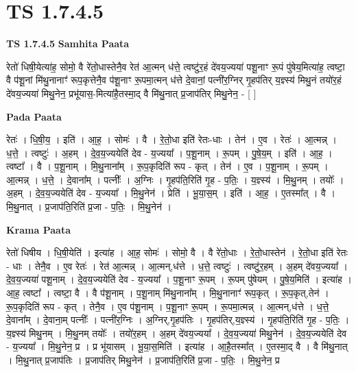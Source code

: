 \documentclass[17pt]{extarticle}
\begin{document}
\section*{ TS 1.7.4.5 }

\textbf{TS 1.7.4.5 } \newline
\textbf{Samhita Paata} \newline

रेतो॑ धिषी॒येत्या॑ह॒ सोमो॒ वै रे॑तो॒धास्तेनै॒व रेत॑ आ॒त्मन् ध॑त्ते॒ त्वष्टु॑र॒हं दे॑वय॒ज्यया॑ पशू॒नाꣳ रू॒पं पु॑षेय॒मित्या॑ह॒ त्वष्टा॒ वै प॑शू॒नां मि॑थु॒नानाꣳ॑ रूप॒कृत्तेनै॒व प॑शू॒नाꣳ रू॒पमा॒त्मन् ध॑त्ते दे॒वानां॒ पत्नी॑र॒ग्निर् गृ॒हप॑तिर् य॒ज्ञ्स्य॑ मिथु॒नं तयो॑र॒हं दे॑वय॒ज्यया॑ मिथु॒नेन॒ प्रभू॑यास॒-मित्या॑है॒तस्मा॒द् वै मि॑थु॒नात् प्र॒जाप॑तिर् मिथु॒नेन॒ - [ ] \newline

\textbf{Pada Paata} \newline

रेतः॑ । धि॒षी॒य॒ । इति॑ । आ॒ह॒ । सोमः॑ । वै । रे॒तो॒धा इति॑ रेतः-धाः । तेन॑ । ए॒व । रेतः॑ । आ॒त्मन्न् । ध॒त्ते॒ । त्वष्टुः॑ । अ॒हम् । दे॒व॒य॒ज्ययेति॑ देव - य॒ज्यया᳚ । प॒शू॒नाम् । रू॒पम् । पु॒षे॒य॒म् । इति॑ । आ॒ह॒ । त्वष्टा᳚ । वै । प॒शू॒नाम् । मि॒थु॒नाना᳚म् । रू॒प॒कृदिति॑ रूप - कृत् । तेन॑ । ए॒व । प॒शू॒नाम् । रू॒पम् । आ॒त्मन्न् । ध॒त्ते॒ । दे॒वाना᳚म् । पत्नीः᳚ । अ॒ग्निः । गृ॒हप॑ति॒रिति॑ गृ॒ह - प॒तिः॒ । य॒ज्ञ्स्य॑ । मि॒थु॒नम् । तयोः᳚ । अ॒हम् । दे॒व॒य॒ज्ययेति॑ देव - य॒ज्यया᳚ । मि॒थु॒नेन॑ । प्रेति॑ । भू॒या॒स॒म् । इति॑ । आ॒ह॒ । ए॒तस्मा᳚त् । वै । मि॒थु॒नात् । प्र॒जाप॑ति॒रिति॑ प्र॒जा - प॒तिः॒ । मि॒थु॒नेन॑ ।  \newline


\textbf{Krama Paata} \newline

रेतो॑ धिषीय । धि॒षी॒येति॑ । इत्या॑ह । आ॒ह॒ सोमः॑ । सोमो॒ वै । वै रे॑तो॒धाः । रे॒तो॒धास्तेन॑ । रे॒तो॒धा इति॑ रेतः - धाः । तेनै॒व । ए॒व रेतः॑ । रेत॑ आ॒त्मन्न् । आ॒त्मन्,ध॑त्ते । ध॒त्ते॒ त्वष्टुः॑ । त्वष्टु॑र॒हम् । अ॒हम् दे॑वय॒ज्यया᳚ । दे॒व॒य॒ज्यया॑ पशू॒नाम् । दे॒व॒य॒ज्ययेति॑ देव - य॒ज्यया᳚ । प॒शू॒नाꣳ रू॒पम् । रू॒पम् पु॑षेयम् । पु॒षे॒य॒मिति॑ । इत्या॑ह । आ॒ह॒ त्वष्टा᳚ । त्वष्टा॒ वै । वै प॑शू॒नाम् । प॒शू॒नाम् मि॑थु॒नाना᳚म् । मि॒थु॒नानाꣳ॑ रूप॒कृत् । रू॒प॒कृत्,तेन॑ । रू॒प॒कृदिति॑ रूप - कृत् । तेनै॒व । ए॒व प॑शू॒नाम् । प॒शू॒नाꣳ रू॒पम् । रू॒पमा॒त्मन्न् । आ॒त्मन्,ध॑त्ते । ध॒त्ते॒ दे॒वाना᳚म् । दे॒वाना॒म् पत्नीः᳚ । पत्नी॑र॒ग्निः । अ॒ग्निर्,गृ॒हप॑तिः । गृ॒हप॑तिर्,य॒ज्ञ्स्य॑ । गृ॒हप॑ति॒रिति॑ गृ॒ह - प॒तिः॒ । य॒ज्ञ्स्य॑ मिथु॒नम् । मि॒थु॒नम् तयोः᳚ । तयो॑र॒हम् । अ॒हम् दे॑वय॒ज्यया᳚ । दे॒व॒य॒ज्यया॑ मिथु॒नेन॑ । दे॒व॒य॒ज्ययेति॑ देव - य॒ज्यया᳚ । मि॒थु॒नेन॒ प्र । प्र भू॑यासम् । भू॒या॒स॒मिति॑ । इत्या॑ह । आ॒है॒तस्मा᳚त् । ए॒तस्मा॒द् वै । वै मि॑थु॒नात् । मि॒थु॒नात् प्र॒जाप॑तिः । प्र॒जाप॑तिर् मिथु॒नेन॑ । प्र॒जाप॑ति॒रिति॑ प्र॒जा - प॒तिः॒ । मि॒थु॒नेन॒ प्र \newline
\end{document}
